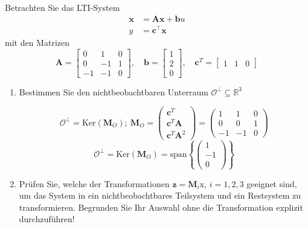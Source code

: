\documentclass[crop=false]{standalone}
\begin{document}
\begin{task}
Betrachten Sie das LTI-System
\[ 
\begin{aligned} \dot{\mathbf{x}} &=\mathbf{A} \mathbf{x}+\mathbf{b} u \\ y &=\mathbf{c}^{\top} \mathbf{x} \end{aligned}
 \]
mit den Matrizen
\[ 
\mathbf{A}=\left[\begin{array}{ccc}{0} & {1} & {0} \\ {0} & {-1} & {1} \\ {-1} & {-1} & {0}\end{array}\right], \quad \mathbf{b}=\left[\begin{array}{c}{1} \\ {2} \\ {0}\end{array}\right], \quad \mathbf{c}^{T}=\left[\begin{array}{lll}{1} & {1} & {0}\end{array}\right]
 \]
 \begin{enumerate}[i]
     \item Bestimmen Sie den nichtbeobachtbaren Unterraum $\mathcal{O}^{\perp} \subseteq \mathbb{R}^{3}$
     \begin{solution}
     \[\mathcal{O}^{\perp} =  \text{Ker}\left(\mathbf{M}_O\right); \ \mathbf{M}_O = 
     \begin{pmatrix} \mathbf{c}^T \\ \mathbf{c}^T \mathbf{A} \\ \mathbf{c}^T \mathbf{A}^2 \end{pmatrix} = 
     \begin{pmatrix} 1 & 1 & 0 \\ 0 & 0 & 1 \\ -1 & -1 & 0 \end{pmatrix}\]
     \[ \mathcal{O}^{\perp}=\text{Ker}\left(\mathbf{M}_O\right) = \text{span}\left\{\begin{pmatrix} 1\\-1\\ 0\end{pmatrix}\right\}\]
     \end{solution}
     \item Prüfen Sie, welche der Transformationen $\mathbf{z}=\mathbf{M}_{i}\mathrm{x}$, $i=1,2,3$ geeignet sind, um
das System in ein nichtbeobachtbares Teilsystem und ein Restsystem zu transformieren.
Begrunden Sie Ihr Auswahl ohne die Transformation explizit durchzuführen!
\[ 
\]
\end{enumerate}
\end{task}
\end{document}

